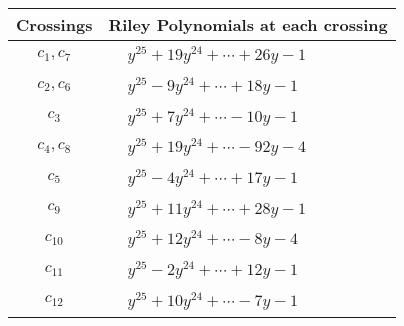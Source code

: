 \documentclass[1p]{elsarticle_modified}
\theoremstyle{definition}
\begin{document}
\begin{tabular}{m{50pt}|m{274pt}}
Crossings & \hspace{64pt}Riley Polynomials at each crossing \\
\hline $$\begin{aligned}c_{1},c_{7}\end{aligned}$$&$\begin{aligned}
&y^{25}+19 y^{24}+\cdots+26 y-1
\end{aligned}$\\
\hline $$\begin{aligned}c_{2},c_{6}\end{aligned}$$&$\begin{aligned}
&y^{25}-9 y^{24}+\cdots+18 y-1
\end{aligned}$\\
\hline $$\begin{aligned}c_{3}\end{aligned}$$&$\begin{aligned}
&y^{25}+7 y^{24}+\cdots-10 y-1
\end{aligned}$\\
\hline $$\begin{aligned}c_{4},c_{8}\end{aligned}$$&$\begin{aligned}
&y^{25}+19 y^{24}+\cdots-92 y-4
\end{aligned}$\\
\hline $$\begin{aligned}c_{5}\end{aligned}$$&$\begin{aligned}
&y^{25}-4 y^{24}+\cdots+17 y-1
\end{aligned}$\\
\hline $$\begin{aligned}c_{9}\end{aligned}$$&$\begin{aligned}
&y^{25}+11 y^{24}+\cdots+28 y-1
\end{aligned}$\\
\hline $$\begin{aligned}c_{10}\end{aligned}$$&$\begin{aligned}
&y^{25}+12 y^{24}+\cdots-8 y-4
\end{aligned}$\\
\hline $$\begin{aligned}c_{11}\end{aligned}$$&$\begin{aligned}
&y^{25}-2 y^{24}+\cdots+12 y-1
\end{aligned}$\\
\hline $$\begin{aligned}c_{12}\end{aligned}$$&$\begin{aligned}
&y^{25}+10 y^{24}+\cdots-7 y-1
\end{aligned}$\\
\hline
\end{tabular}\\~\\
\end{document}
